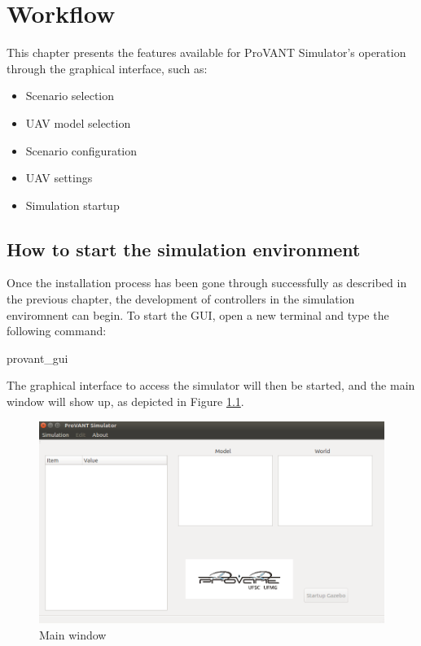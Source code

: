 \chapter{Workflow}
\label{workflow}

This chapter presents the features available for ProVANT Simulator's operation through the graphical interface, such as:

\begin{itemize}
\setlength{\itemsep}{1pt}
\setlength{\parskip}{0pt}
\setlength{\parsep}{0pt}
\item Scenario selection
\item UAV model selection
\item Scenario configuration
\item UAV settings
\item Simulation startup
\end{itemize}
 
\section{How to start the simulation environment}

Once the installation process has been gone through successfully as described in the previous chapter, the development of controllers in the simulation enviromnent can begin. To start the GUI, open a new terminal and type the following command:

\begin{bashcode}
 provant_gui
\end{bashcode}

The graphical interface to access the simulator will then be started, and the main window will show up, as depicted in Figure \ref{1}.

\begin{figure}[!ht]
	\centering
	\includegraphics[width=0.8\columnwidth]{figuras/1.png}
	\caption{Main window}
	\label{1}
\end{figure}

